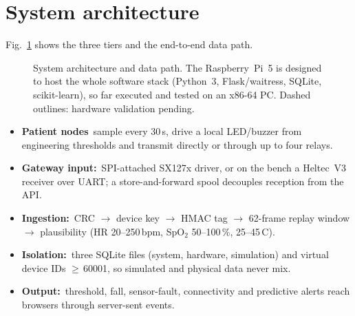 \documentclass[10pt,a4paper]{article}
\newcommand{\lead}[1]{\textbf{#1}\,}
\begin{document}
\section{System architecture}
Fig.~\ref{fig:architecture} shows the three tiers and the end-to-end data path.
\begin{figure}[!htb]
\centering
\resizebox{\textwidth}{!}{}
\caption{System architecture and data path. The Raspberry~Pi~5 is designed to host the whole software stack (Python~3, Flask/waitress, SQLite, scikit-learn), so far executed and tested on an x86-64 PC. Dashed outlines: hardware validation pending.}
\label{fig:architecture}
\end{figure}
\begin{itemize}
\item \lead{Patient nodes} sample every 30\,s, drive a local LED/buzzer from engineering thresholds and transmit directly or through up to four relays.
\item \lead{Gateway input:} SPI-attached SX127x driver, or on the bench a Heltec~V3 receiver over UART; a store-and-forward spool decouples reception from the API.
\item \lead{Ingestion:} CRC $\to$ device key $\to$ HMAC tag $\to$ 62-frame replay window $\to$ plausibility (HR 20--250\,bpm, SpO$_2$ 50--100\,\%, 25--45\,\textdegree C).
\item \lead{Isolation:} three SQLite files (system, hardware, simulation) and virtual device IDs $\geq$\,60001, so simulated and physical data never mix.
\item \lead{Output:} threshold, fall, sensor-fault, connectivity and predictive alerts reach browsers through server-sent events.
\end{itemize}

\end{document}
